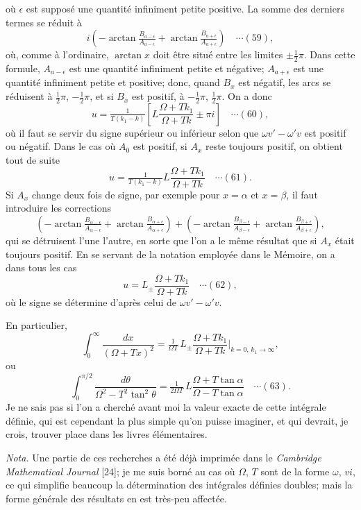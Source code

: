 \documentclass[12pt,a4paper]{article}
\begin{document}
o\`u $\epsilon$ est suppos\'e une quantit\'e infiniment petite positive. La somme des derniers termes se r\'eduit \`a
\[
i\left(-\arctan\tfrac{B_{a-\epsilon}}{A_{a-\epsilon}} + \arctan\tfrac{B_{a+\epsilon}}{A_{a+\epsilon}}\right) \quad\cdots(59),
\]
o\`u, comme \`a l'ordinaire, $\arctan x$ doit \^etre situ\'e entre les limites $\pm\tfrac12\pi$. Dans cette formule, $A_{a-\epsilon}$ est une quantit\'e infiniment petite et n\'egative; $A_{a+\epsilon}$ est une quantit\'e infiniment petite et positive; donc, quand $B_x$ est n\'egatif, les arcs se r\'eduisent \`a $\tfrac12\pi$, $-\tfrac12\pi$, et si $B_x$ est positif, \`a $-\tfrac12\pi$, $\tfrac12\pi$. On a donc
\[
u = \tfrac{1}{T(k_1 - k)}\left[L\frac{\Omega + T k_1}{\Omega + Tk} \pm \pi i\right] \quad\cdots(60),
\]
o\`u il faut se servir du signe sup\'erieur ou inf\'erieur selon que $\omega v' - \omega' v$ est positif ou n\'egatif. Dans le cas o\`u $A_0$ est positif, si $A_x$ reste toujours positif, on obtient tout de suite
\[
u = \tfrac{1}{T(k_1 - k)}L\frac{\Omega + T k_1}{\Omega + Tk} \quad\cdots(61).
\]
Si $A_x$ change deux fois de signe, par exemple pour $x = \alpha$ et $x = \beta$, il faut introduire les corrections
\[
\left(-\arctan\tfrac{B_{\alpha-\epsilon}}{A_{\alpha-\epsilon}} + \arctan\tfrac{B_{\alpha+\epsilon}}{A_{\alpha+\epsilon}}\right) + \left(-\arctan\tfrac{B_{\beta-\epsilon}}{A_{\beta-\epsilon}} + \arctan\tfrac{B_{\beta+\epsilon}}{A_{\beta+\epsilon}}\right),
\]
qui se d\'etruisent l'une l'autre, en sorte que l'on a le m\^eme r\'esultat que si $A_x$ \'etait toujours positif. En se servant de la notation employ\'ee dans le M\'emoire, on a dans tous les cas
\[
u = L_{\pm}\frac{\Omega + T k_1}{\Omega + Tk} \quad\cdots(62),
\]
o\`u le signe se d\'etermine d'apr\`es celui de $\omega v' - \omega' v$.

En particulier,
\[
\int_0^{\infty}\frac{dx}{(\Omega + Tx)^2} = \tfrac{1}{\Omega T}\,L_{\pm}\frac{\Omega + Tk_1}{\Omega + Tk}\bigg|_{k = 0,\, k_1 \to \infty},
\]
ou
\[
\int_0^{\pi/2}\frac{d\theta}{\Omega^2 - T^2\tan^2\theta} = \tfrac{1}{2\Omega T}\,L\frac{\Omega + T\tan\alpha}{\Omega - T\tan\alpha} \quad\cdots(63).
\]
Je ne sais pas si l'on a cherch\'e avant moi la valeur exacte de cette int\'egrale d\'efinie, qui est cependant la plus simple qu'on puisse imaginer, et qui devrait, je crois, trouver place dans les livres \'el\'ementaires.

\medskip
\textit{Nota.} Une partie de ces recherches a \'et\'e d\'ej\`a imprim\'ee dans le \textit{Cambridge Mathematical Journal} [24]; je me suis born\'e au cas o\`u $\Omega$, $T$ sont de la forme $\omega$, $vi$, ce qui simplifie beaucoup la d\'etermination des int\'egrales d\'efinies doubles; mais la forme g\'en\'erale des r\'esultats en est tr\`es-peu affect\'ee.
\end{document}
